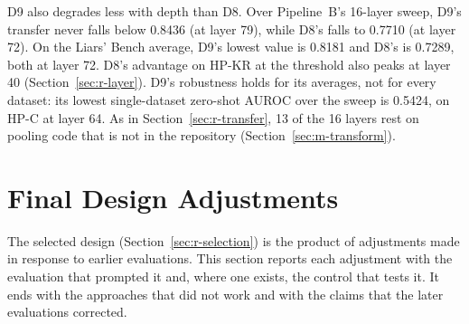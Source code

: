D9 also degrades less with depth than D8. %
Over Pipeline~B's 16-layer sweep, D9's transfer never falls below 0.8436 (at layer 79), while D8's falls to 0.7710 (at layer 72). %
On the Liars' Bench average, D9's lowest value is 0.8181 and D8's is 0.7289, both at layer 72. %
D8's advantage on HP-KR at the threshold also peaks at layer 40 (Section~\ref{sec:r-layer}). %
D9's robustness holds for its averages, not for every dataset: its lowest single-dataset zero-shot AUROC over the sweep is 0.5424, on HP-C at layer 64. %
As in Section~\ref{sec:r-transfer}, 13 of the 16 layers rest on pooling code that is not in the repository (Section~\ref{sec:m-transform}). %

\section{Final Design Adjustments}
\label{sec:r-adjust}

The selected design (Section~\ref{sec:r-selection}) is the product of adjustments made in response to earlier evaluations.
This section reports each adjustment with the evaluation that prompted it and, where one exists, the control that tests it.
It ends with the approaches that did not work and with the claims that the later evaluations corrected.

